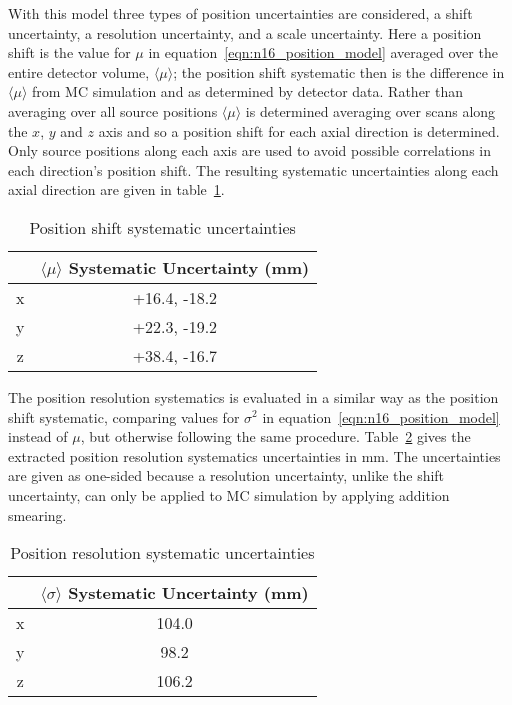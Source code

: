 With this model three types of position uncertainties are considered, a shift
uncertainty, a resolution uncertainty, and a scale uncertainty.
Here a position shift is the value for $\mu$ in equation~\eqref{eqn:n16_position_model}
averaged over the entire detector volume, $\langle \mu \rangle$;
the position shift systematic then is the difference in $\langle \mu \rangle$
from MC simulation and as determined by detector data.
Rather than averaging over all source positions $\langle \mu \rangle$
is determined averaging over scans along the $x$, $y$ and $z$ axis and
so a position shift for each axial direction is determined.
Only source positions along each axis are used to avoid possible correlations
in each direction's position shift. The resulting systematic uncertainties along
each axial direction are given in table~\ref{tbl:position_shift_systs}.
\begin{table}
    \centering
    \begin{tabular}{|c|c|}
            \hline
            &$\langle \mu \rangle$ Systematic Uncertainty (mm)\\
            \hline
            x&+16.4, -18.2\\
            y&+22.3, -19.2\\
            z&+38.4, -16.7\\
            \hline
    \end{tabular}
    \caption{Position shift systematic uncertainties}
    \label{tbl:position_shift_systs}
\end{table}

The position resolution systematics is evaluated in a similar way as the position
shift systematic, comparing values for
$\sigma^{2}$ in equation~\eqref{eqn:n16_position_model} instead of $\mu$,
but otherwise following the same procedure.
Table~\ref{tbl:position_resolution_systs} gives the extracted position resolution systematics uncertainties
in $\text{mm}$. The uncertainties are given as one-sided because a resolution uncertainty,
unlike the shift uncertainty,
can only be applied to MC simulation by applying addition smearing.
\begin{table}
    \centering
    \begin{tabular}{|c|c|}
            \hline
            &$\langle \sigma \rangle$ Systematic Uncertainty (mm)\\
            \hline
            x&104.0\\
            y&98.2\\
            z&106.2\\
            \hline
    \end{tabular}
    \caption{Position resolution systematic uncertainties}
    \label{tbl:position_resolution_systs}
\end{table}


